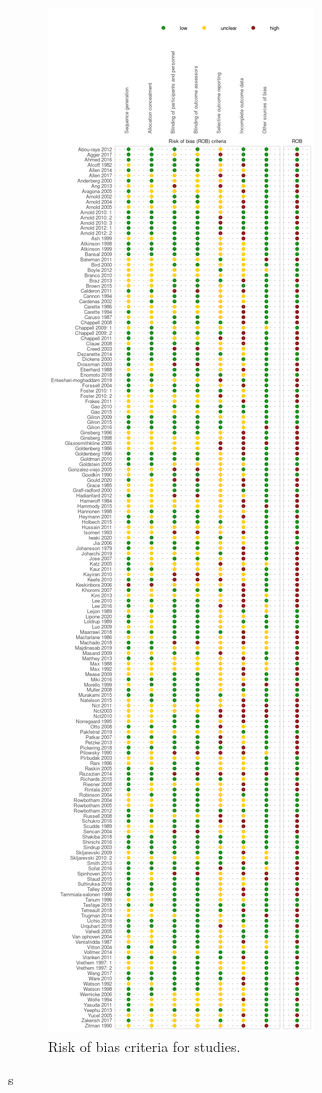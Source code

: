 \documentclass{report}\usepackage[]{graphicx}\usepackage[]{color}
\begin{document}
\begin{figure}
\includegraphics{img/rob-grid.png}
\caption{Risk of bias criteria for studies.}
\label{fig:rob-grid}
\end{figure}
s
\end{document}
